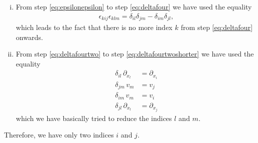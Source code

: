 \documentclass[12pt]{article}
\begin{document}
\begin{enumerate}[(i)]
	\item From step \eqref{eq:epsilonepsilon} to step \eqref{eq:deltafour} we have used the equality
	      \begin{align}
		      \epsilon_{kij}\epsilon_{klm} = \delta_{il}\delta_{jm} - \delta_{im}\delta_{jl},
	      \end{align}
	      which leads to the fact that there is no more index $k$ from step \eqref{eq:deltafour} onwards.
	      
	\item From step \eqref{eq:deltafourtwo} to step \eqref{eq:deltafourtwoshorter} we have used the equality
	      \begin{align}
		      \delta_{il}\, \partial_{x_l} & = \partial_{x_i} \\
		      \delta_{jm}\, v_m            & = v_j            \\
		      \delta_{im}\, v_m            & = v_i            \\
		      \delta_{jl}\, \partial_{x_l} & = \partial_{x_j}
	      \end{align}
	      which we have basically tried to reduce the indices $l$ and $m$.
\end{enumerate}
Therefore, we have only two indices $i$ and $j$.


% 
\end{document}
